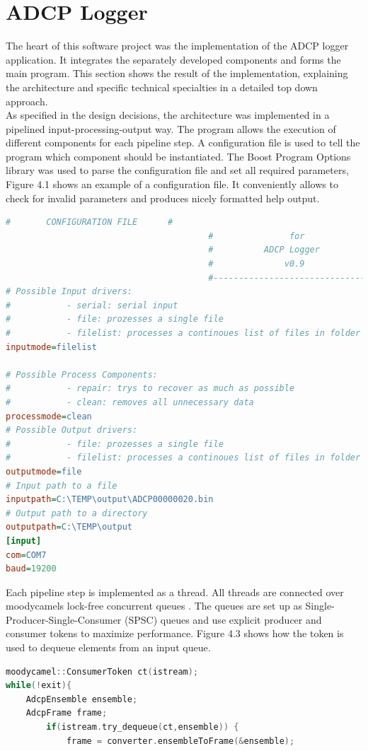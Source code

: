 \section{ADCP Logger}
The heart of this software project was the implementation of the ADCP logger application. It integrates the separately developed components and forms the main program. This section shows the result of the implementation, explaining the architecture and specific technical specialties in a detailed top down approach.\\
As specified in the design decisions, the architecture was implemented in a pipelined input-processing-output way. The program allows the execution of different components for each pipeline step. A configuration file is used to tell the program which component should be instantiated. The Boost Program Options library was used to parse the configuration file and set all required parameters, Figure 4.1 shows an example of a configuration file. It conveniently allows to check for invalid parameters and produces nicely formatted help output.
\begin{lstlisting}[language={Ini}, caption=A Snippet of a configuration file for the ADCP logger application.]
                                        #       CONFIGURATION FILE      #
                                        #               for             #
                                        #          ADCP Logger          #
                                        #              v0.9             #
                                        #-------------------------------#
# Possible Input drivers:
#           - serial: serial input
#           - file: prozesses a single file
#           - filelist: processes a continoues list of files in folder
inputmode=filelist

# Possible Process Components:
#           - repair: trys to recover as much as possible
#           - clean: removes all unnecessary data
processmode=clean
# Possible Output drivers:
#           - file: prozesses a single file
#           - filelist: processes a continoues list of files in folder
outputmode=file
# Input path to a file
inputpath=C:\TEMP\output\ADCP00000020.bin
# Output path to a directory
outputpath=C:\TEMP\output
[input]
com=COM7
baud=19200
\end{lstlisting}

Each pipeline step is implemented as a thread. All threads are connected over moodycamels lock-free concurrent queues \cite{moody}. The queues are set up as Single-Producer-Single-Consumer (SPSC) queues and use explicit producer and consumer tokens to maximize performance. Figure 4.3 shows how the token is used to dequeue elements from an input queue.
\begin{lstlisting}[language=C++, caption=Code snippet showing the use of consumer tokens.]
moodycamel::ConsumerToken ct(istream);
while(!exit){
    AdcpEnsemble ensemble;
    AdcpFrame frame;
        if(istream.try_dequeue(ct,ensemble)) {
            frame = converter.ensembleToFrame(&ensemble);
\end{lstlisting}

